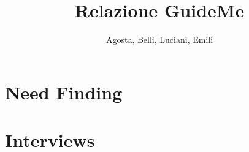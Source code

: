 \documentclass[12pt]{article}\pagestyle{myheadings}
\date{}
\title{\textbf{\huge{Relazione GuideMe}}}
\author{Agosta, Belli, Luciani, Emili}
\newcounter{interview}
\begin{document}
\clearpage\maketitle
\thispagestyle{empty}
\clearpage

\thispagestyle{empty}
\tableofcontents

\clearpage

\section{Need Finding}


\section{Interviews}


\clearpage


\end{document}
